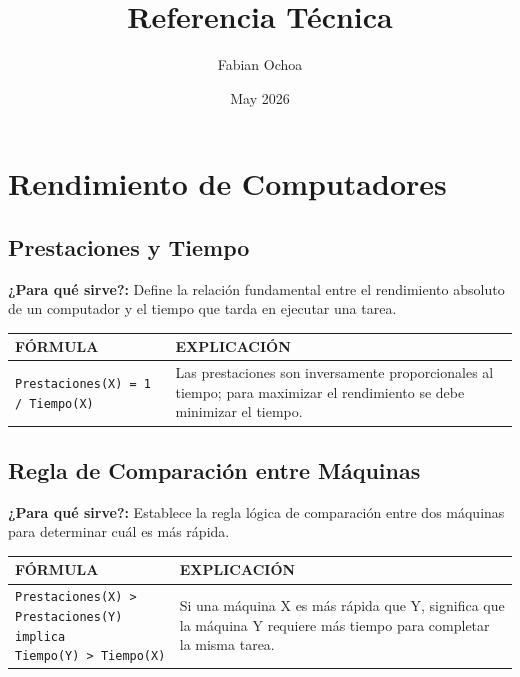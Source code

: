 \documentclass[12pt,letterpaper]{article}
\title{Referencia Técnica}
\author{Fabian Ochoa}
\date{May 2026}
\begin{document}
\maketitle

\section{Rendimiento de Computadores}

\renewcommand{\arraystretch}{1.5}

\subsection{Prestaciones y Tiempo}
\textbf{¿Para qué sirve?:} Define la relación fundamental entre el rendimiento absoluto de un computador y el tiempo que tarda en ejecutar una tarea.

\begin{table}[H]
    \centering
    \begin{tabularx}{\textwidth}{|l|X|}\hline
         \textbf{FÓRMULA} & \textbf{EXPLICACIÓN} \\\hline
         \texttt{Prestaciones(X) = 1 / Tiempo(X)} & Las prestaciones son inversamente proporcionales al tiempo; para maximizar el rendimiento se debe minimizar el tiempo. \\ \hline
    \end{tabularx}    
\end{table}

\subsection{Regla de Comparación entre Máquinas}
\textbf{¿Para qué sirve?:} Establece la regla lógica de comparación entre dos máquinas para determinar cuál es más rápida.

\begin{table}[H]
    \centering
    \begin{tabularx}{\textwidth}{|l|X|}\hline
         \textbf{FÓRMULA} & \textbf{EXPLICACIÓN} \\\hline
         \makecell[l]{\texttt{Prestaciones(X) > Prestaciones(Y)} \\ \texttt{implica} \\ \texttt{Tiempo(Y) > Tiempo(X)}} & Si una máquina X es más rápida que Y, significa que la máquina Y requiere más tiempo para completar la misma tarea. \\ \hline
    \end{tabularx}    
\end{table}
\end{document}
